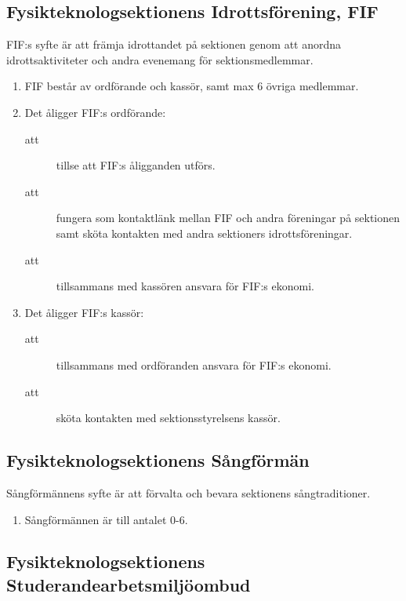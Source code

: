 \documentclass[11pt,a4paper]{article}
\begin{document}
\subsection{Fysikteknologsektionens Idrottsförening, FIF}
FIF:s syfte är att främja idrottandet på sektionen genom att anordna idrottsaktiviteter och andra evenemang för sektionsmedlemmar.
\begin{enumerate}[\thesubsection .1]

  \item FIF består av ordförande och kassör, samt max 6 övriga
  medlemmar.

  \item Det åligger FIF:s ordförande:
    \begin{description}
      \item[att] tillse att FIF:s åligganden utförs.
      \item[att] fungera som kontaktlänk mellan FIF och andra
      föreningar på sektionen samt sköta kontakten med andra
      sektioners idrotts\-före\-ning\-ar.
      \item[att] tillsammans med kassören ansvara för FIF:s ekonomi.
    \end{description}

  \item Det åligger FIF:s kassör:
    \begin{description}
      \item[att] tillsammans med ordföranden ansvara för FIF:s ekonomi.
      \item[att] sköta kontakten med sektionsstyrelsens kassör.
    \end{description}

\end{enumerate}

\subsection{Fysikteknologsektionens Sångförmän}
Sångförmännens syfte är att förvalta och bevara sektionens sångtraditioner.
\begin{enumerate}[\thesubsection .1]

  \item Sångförmännen är till antalet 0-6.

\end{enumerate}

\subsection{Fysikteknologsektionens Studerandearbetsmiljöombud}
\end{document}
